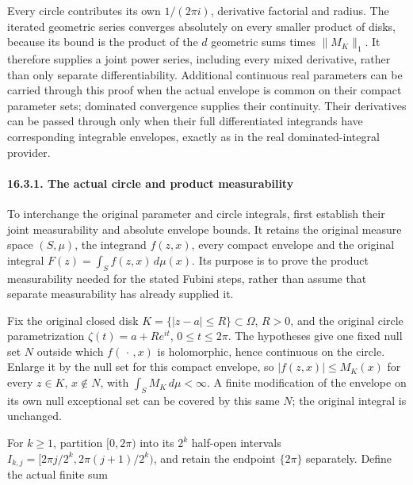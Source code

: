 \documentclass[
  11pt,
]{article}
\makeatletter
\let\ReaderOriginalAnchorStart\hyper@anchorstart
\let\ReaderOriginalAnchorEnd\hyper@anchorend
\let\ReaderPendingAliases\@empty
\def\ReaderArmAliases#1{\gdef\ReaderPendingAliases{#1}}
\def\hyper@anchorstart#1{\ReaderIfNativeAnchorTF{#1}{\ReaderPendingAliases\global\let\ReaderPendingAliases\@empty}{}\ReaderOriginalAnchorStart{#1}}
\makeatother
\begin{document}
Every circle contributes its own \(1/(2\pi i)\), derivative factorial
and radius. The iterated geometric series converges absolutely on every
smaller product of disks, because its bound is the product of the \(d\)
geometric sums times \(\|M_K\|_1\). It therefore supplies a joint power
series, including every mixed derivative, rather than only separate
differentiability. Additional continuous real parameters can be carried
through this proof when the actual envelope is common on their compact
parameter sets; dominated convergence supplies their continuity. Their
derivatives can be passed through only when their full differentiated
integrands have corresponding integrable envelopes, exactly as in the
real dominated-integral provider.

\ReaderArmAliases{\ReaderOriginalAnchorStart{AN03-CN-INTEGRAL-MEASURE-001}\ReaderOriginalAnchorEnd\begingroup\expandafter\def\csname @currentHref\endcsname{AN03-CN-INTEGRAL-MEASURE-001}\label{AN03-CN-INTEGRAL-MEASURE-001}\endgroup\ReaderOriginalAnchorStart{the-actual-circle-and-product-measurability}\ReaderOriginalAnchorEnd}
\paragraph{16.3.1. The actual circle and product
measurability}\label{the-actual-circle-and-product-measurability}

To interchange the original parameter and circle integrals, first
establish their joint measurability and absolute envelope bounds. It
retains the original measure space \((S,\mu)\), the integrand
\(f(z,x)\), every compact envelope and the original integral
\(F(z)=\int_S f(z,x)\,d\mu(x)\). Its purpose is to prove the product
measurability needed for the stated Fubini steps, rather than assume
that separate measurability has already supplied it.

Fix the original closed disk \(K=\{|z-a|\leq R\}\subset\Omega\),
\(R>0\), and the original circle parametrization \(\zeta(t)=a+Re^{it}\),
\(0\leq t\leq2\pi\). The hypotheses give one fixed null set \(N\)
outside which \(f(\,\cdot\,,x)\) is holomorphic, hence continuous on the
circle. Enlarge it by the null set for this compact envelope, so
\(|f(z,x)|\leq M_K(x)\) for every \(z\in K\), \(x\notin N\), with
\(\int_S M_K\,d\mu<\infty\). A finite modification of the envelope on
its own null exceptional set can be covered by this same \(N\); the
original integral is unchanged.

For \(k\geq1\), partition \([0,2\pi)\) into its \(2^k\) half-open
intervals \(I_{k,j}=[2\pi j/2^k,2\pi(j+1)/2^k)\), and retain the
endpoint \(\{2\pi\}\) separately. Define the actual finite sum
\end{document}
